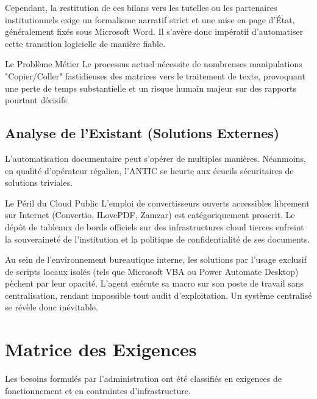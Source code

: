 \documentclass[12pt,a4paper,oneside]{report}
\begin{document}
Cependant, la restitution de ces bilans vers les tutelles ou les partenaires institutionnels exige un formalisme narratif strict et une mise en page d'État, généralement fixés sous Microsoft Word. Il s'avère donc impératif d'automatiser cette transition logicielle de manière fiable.

\begin{warningbox}{Le Problème Métier}
Le processus actuel nécessite de nombreuses manipulations "Copier/Coller" fastidieuses des matrices vers le traitement de texte, provoquant une perte de temps substantielle et un risque humain majeur sur des rapports pourtant décisifs. 
\end{warningbox}

\section{Analyse de l'Existant (Solutions Externes)}

L'automatisation documentaire peut s'opérer de multiples manières. Néanmoins, en qualité d'opérateur régalien, l'ANTIC se heurte aux écueils sécuritaires de solutions triviales.

\begin{dangerbox}{Le Péril du Cloud Public}
L'emploi de convertisseurs ouverts accessibles librement sur Internet (Convertio, ILovePDF, Zamzar) est catégoriquement proscrit. Le dépôt de tableaux de bords officiels sur des infrastructures cloud tierces enfreint la souveraineté de l'institution et la politique de confidentialité de ses documents.
\end{dangerbox}

Au sein de l'environnement bureautique interne, les solutions par l'usage exclusif de scripts locaux isolés (tels que Microsoft VBA ou Power Automate Desktop) pèchent par leur opacité. L'agent exécute sa macro sur son poste de travail sans centralisation, rendant impossible tout audit d'exploitation. Un système centralisé se révèle donc inévitable.


\chapter{Matrice des Exigences}

Les besoins formulés par l'administration ont été classifiés en exigences de fonctionnement et en contraintes d'infrastructure.
\end{document}
